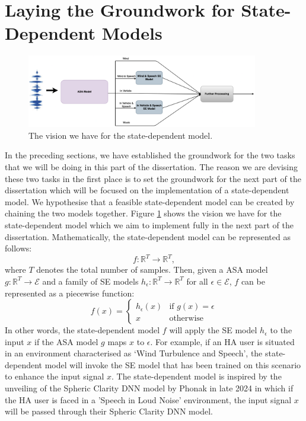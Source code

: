 \documentclass[logo,bsc,singlespacing,parskip,online]{infthesis}
\begin{document}
\section{Laying the Groundwork for State-Dependent Models}
\begin{figure}[h] \centering
   \includegraphics[width=0.9\textwidth]{state-model-diagram.png}
   \caption{The vision we have for the state-dependent model.}
   \label{fig:state-dependent-model}
\end{figure}
In the preceding sections, we have established the groundwork for the two tasks that we will be doing in this part of the dissertation.
The reason we are devising these two tasks in the first place is to set the groundwork for the next part of the dissertation which 
will be focused on the implementation of a state-dependent model. We hypothesise that a feasible state-dependent model can be created 
by chaining the two models together. Figure \ref{fig:state-dependent-model} shows the vision we have for the state-dependent model which we aim to implement fully in the next part of the dissertation.
Mathematically, the state-dependent model can be represented as follows:
\[
f: \mathbb{R}^{T} \to \mathbb{R}^{T},
\]
where \(T\) denotes the total number of samples. 
Then, given a ASA model $g : \mathbb{R}^{T} \to \mathcal{E}$ and a family of SE models $h_{\epsilon} : \mathbb{R}^{T} \to \mathbb{R}^{T}$ for all \(\epsilon \in \mathcal{E}\), 
$f$ can be represented as a piecewise function:
\begin{equation}
   f(x) = 
   \begin{cases} 
      h_{\epsilon}(x) & \text{if } g(x) = \epsilon \\
      x & \text{otherwise}
   \end{cases}
\end{equation}
In other words, the state-dependent model $f$ will apply the SE model $h_{\epsilon}$ to the input $x$ if the ASA model $g$ maps $x$ to \(\epsilon\).
For example, if an HA user is situated in an environment characterised as `Wind Turbulence and Speech',
the state-dependent model will invoke the SE model that has been trained on this scenario to enhance the input signal $x$.
The state-dependent model is inspired by the unveiling of the Spheric Clarity DNN model by Phonak \citep{Hasemann2024PhonakSphere} in late 2024
in which if the HA user is faced in a 'Speech in Loud Noise' environment, the input signal $x$ will be passed through their Spheric Clarity DNN model.
\end{document}
